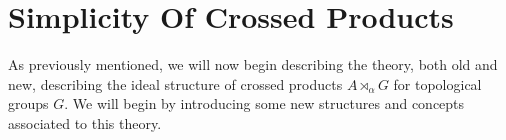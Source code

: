 \chapter{Simplicity Of Crossed Products}
As previously mentioned, we will now begin describing the theory, both old and new, describing the ideal structure of crossed products $A \rtimes_\alpha G$ for topological groups $G$. We will begin by introducing some new structures and concepts associated to this theory.


